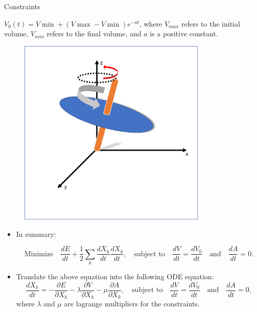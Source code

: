 \documentclass[10pt]{beamer}
\begin{document}
\begin{frame}{Constraints}

$V_{0}(t) = V\min + (V\max-V\min)e^{-at}$, where $V_{max}$ refers to the initial volume, $V_{min}$ refers to the final volume, and $a$ is a positive constant.

\begin{figure}
	\centering
	\includegraphics[width=0.8\textwidth]{sphere1.png}
\end{figure}

\end{frame}


\begin{frame}
\begin{itemize}
\item In summary:

\small
\begin{equation}
\text{Minimize} \quad \frac{dE}{dt} +\frac{1}{2}\sum_{k} \frac{dX_{k}}{dt} \frac{dX_{k}}{dt},\quad \text{subject to}\quad \frac{dV}{dt} = \frac{dV_{0}}{dt} \quad \text{and}\quad \frac{dA}{dt} = 0. \nonumber
\end{equation}
\normalsize
\vspace{5mm}

\item Translate the above equation into the following ODE equation:
\small
\begin{equation}
\frac{dX_{k}}{dt} = - \frac{\partial E}{\partial X_{k}} - \lambda \frac{\partial V}{\partial X_{k}} - \mu \frac{\partial A}{\partial X_{k}},\quad \text{subject to}\quad \frac{dV}{dt} = \frac{dV_{0}}{dt} \quad \text{and} \quad \frac{dA}{dt} = 0, \nonumber
\end{equation}
\normalsize
where $\lambda$ and $\mu$ are lagrange multipliers for the constraints.

\end{itemize}

\end{frame}
\end{document}
